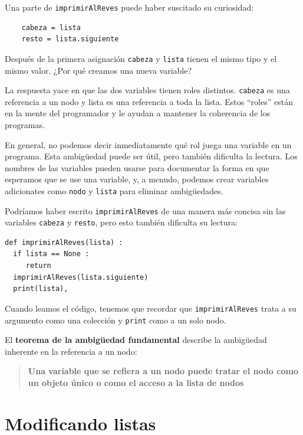  

Una parte de \texttt{imprimirAlReves} puede haber suscitado su curiosidad:

\beforeverb 
\begin{verbatim}
    cabeza = lista
    resto = lista.siguiente
\end{verbatim}
\afterverb Después de la primera asignación \texttt{cabeza} y \texttt{lista}
tienen el mismo tipo y el mismo valor. ¿Por qué creamos una nueva
variable?

La respuesta yace en que las dos variables tienen roles distintos.
\texttt{cabeza} es una referencia a un nodo y lista es una referencia
a toda la lista. Estos ``roles'' están en la mente del programador
y le ayudan a mantener la coherencia de los programas.

 

En general, no podemos decir inmediatamente qué rol juega una variable
en un programa. Esta ambigüedad puede ser útil, pero también dificulta
la lectura. Los nombres de las variables pueden usarse para documentar
la forma en que esperamos que se use una variable, y, a menudo, podemos
crear variables adicionates como \texttt{nodo} y \texttt{lista} para
eliminar ambigüedades.

Podríamos haber escrito \texttt{imprimirAlReves} de una manera más
concisa sin las variables \texttt{cabeza} y \texttt{resto}, pero esto
también dificulta su lectura:

\beforeverb 
\begin{verbatim}
def imprimirAlReves(lista) :
  if lista == None : 
     return
  imprimirAlReves(lista.siguiente)
  print(lista),
\end{verbatim}
\afterverb Cuando leamos el código, tenemos que recordar que \texttt{imprimirAlReves}
trata a su argumento como una colección y \texttt{print} como a un
solo nodo.

El \textbf{teorema de la ambigüedad fundamental} describe la ambigüedad
inherente en la referencia a un nodo:
\begin{quote}
\textbf{Una variable que se refiera a un nodo puede tratar el nodo
como un objeto único o como el acceso a la lista de nodos} 
\end{quote}

\section{Modificando listas}

